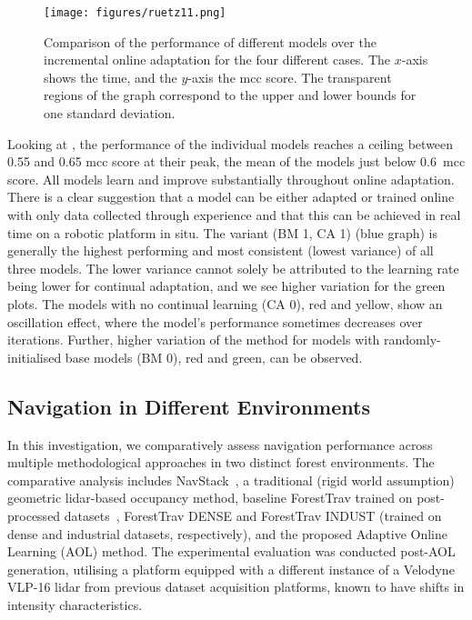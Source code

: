 \begin{figure*}[ht!]
 \centering
 \texttt{[image: figures/ruetz11.png]}
 \caption{Comparison of the performance of different models over the incremental online adaptation for the four different cases. The $x$-axis shows the time, and the $y$-axis the \ac{mcc} score. The transparent regions of the graph correspond to the upper and lower bounds for one standard deviation.}
 \label{fig:aol_incr_perf}
\end{figure*}

Looking at , the performance of the individual models reaches a ceiling between 0.55 and 0.65 \ac{mcc} score at their peak, the mean of the models just below 0.6~\ac{mcc} score. All models learn and improve substantially throughout online adaptation. There is a clear suggestion that a model can be either adapted or trained online with only data collected through experience and that this can be achieved in real time on a robotic platform in situ.
The variant (BM 1, CA 1) (blue graph) is generally the highest performing and most consistent (lowest variance) of all three models. The lower variance cannot solely be attributed to the learning rate being lower for continual adaptation, and we see higher variation for the green plots. The models with no continual learning (CA 0), red and yellow, show an oscillation effect, where the model's performance sometimes decreases over iterations. Further, higher variation of the method for models with randomly-initialised base models (BM 0), red and green, can be observed. 

\subsection{Navigation in Different Environments}
\label{subse:nav_in_different_env}
In this investigation, we comparatively assess navigation performance across multiple methodological approaches in two distinct forest environments. The comparative analysis includes NavStack~\cite{HudTal21}, a traditional (rigid world assumption) geometric lidar-based occupancy method, baseline ForestTrav trained on post-processed datasets~\cite{ruetz2024foresttrav}, ForestTrav DENSE and ForestTrav INDUST (trained on dense and industrial datasets, respectively), and the proposed Adaptive Online Learning (AOL) method. The experimental evaluation was conducted post-AOL generation, utilising a platform equipped with a different instance of a Velodyne VLP-16 lidar from previous dataset acquisition platforms, known to have shifts in intensity characteristics.

